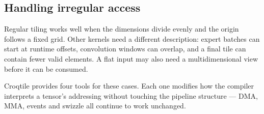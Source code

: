 \subsection*{Handling irregular access}

Regular tiling works well when the dimensions divide evenly and the origin follows a fixed grid. Other kernels need a different description: expert batches can start at runtime offsets, convolution windows can overlap, and a final tile can contain fewer valid elements. A flat input may also need a multidimensional view before it can be consumed.

Croqtile provides four tools for these cases. Each one modifies how the compiler interprets a tensor's addressing without touching the pipeline structure --- DMA, MMA, events and swizzle all continue to work unchanged.
